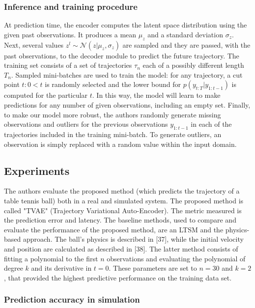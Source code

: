 \subsubsection{Inference and training procedure}\label{header-n968}

At prediction time, the encoder computes the latent space distribution
using the given past observations. It produces a mean $\mu_z$ and a
standard deviation $\sigma_z$. Next, several values
$z^l \sim {\mathcal N}(z | \mu_z, \sigma_z)$ are sampled and they are
passed, with the past observations, to the decoder module to predict the
future trajectory. The training set consists of a set of trajectories
$\tau_n$ each of a possibly different length $T_n$. Sampled
mini-batches are used to train the model: for any trajectory, a cut
point $t : 0 <t $ is randomly selected and the lower bound for
$p(y_{t:T} | y_{1:t−1})$ is computed for the particular $t$. In this
way, the model will learn to make predictions for any number of given
observations, including an empty set. Finally, to make our model more
robust, the authors randomly generate missing observations and outliers
for the previous observations $y_{1:t−1}$ in each of the trajectories
included in the training mini-batch. To generate outliers, an
observation is simply replaced with a random value within the input
domain.

\subsection{Experiments}\label{header-n970}

The authors evaluate the proposed method (which predicts the trajectory
of a table tennis ball) both in a real and simulated system. The
proposed method is called "TVAE" (Trajectory Variational Auto-Encoder).
The metric measured is the prediction error and latency. The baseline
methods, used to compare and evaluate the performance of the proposed
method, are an LTSM and the physics-based approach. The ball's physics
is described in {[}37{]}, while the initial velocity and position are
calculated as described in {[}38{]}. The latter method consists of
fitting a polynomial to the first $n$ observations and evaluating the
polynomial of degree $k$ and its derivative in $t = 0$. These
parameters are set to $n = 30$ and $k = 2$, that provided the
highest predictive performance on the training data set.

\subsubsection{Prediction accuracy in simulation}\label{header-n972}

